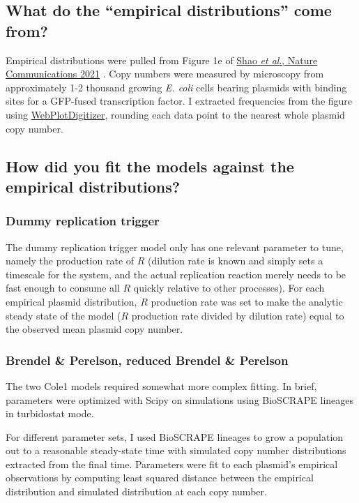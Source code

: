 \documentclass[preprint,12pt]{oldplainarticle}
\begin{document}
\subsection{What do the ``empirical distributions'' come from?} 

Empirical distributions were pulled from Figure 1e of \href{https://doi.org/10.1038/s41467-021-21734-y}{Shao \emph{et al}., Nature Communications 2021} \cite{Shao2021}. Copy numbers were measured by microscopy from approximately 1-2 thousand growing \emph{E. coli} cells bearing plasmids with binding sites for a GFP-fused transcription factor. I extracted frequencies from the figure using \href{https://automeris.io/WebPlotDigitizer/}{WebPlotDigitizer}, rounding each data point to the nearest whole plasmid copy number.

\subsection{How did you fit the models against the empirical distributions?}

\subsubsection{Dummy replication trigger}

The dummy replication trigger model only has one relevant parameter to tune, namely the production rate of $R$ (dilution rate is known and simply sets a timescale for the system, and the actual replication reaction merely needs to be fast enough to consume all $R$ quickly relative to other processes). For each empirical plasmid distribution, $R$ production rate was set to make the analytic steady state of the model ($R$ production rate divided by dilution rate) equal to the observed mean plasmid copy number. 

\subsubsection{Brendel \& Perelson, reduced Brendel \& Perelson}\label{sec:bp_howto_model}

The two Cole1 models required somewhat more complex fitting. In brief, parameters were optimized with Scipy on simulations using BioSCRAPE lineages in turbidostat mode.

For different parameter sets, I used BioSCRAPE lineages to grow a population out to a reasonable steady-state time with simulated copy number distributions extracted from the final time. Parameters were fit to each plasmid's empirical observations by computing least squared distance between the empirical distribution and simulated distribution at each copy number. 
\end{document}
